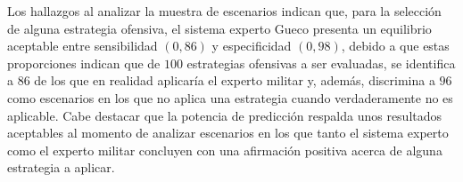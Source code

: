 Los hallazgos al analizar la muestra de escenarios indican que, para la selección de alguna estrategia ofensiva, el sistema experto Gueco presenta un equilibrio aceptable entre sensibilidad $(0,86)$ y especificidad $(0,98)$, debido a que estas proporciones indican que de $100$ estrategias ofensivas a ser evaluadas, se identifica a $86$ de los que en realidad aplicaría el experto militar y, además, discrimina a $96$ como escenarios en los que no aplica una estrategia cuando verdaderamente no es aplicable. Cabe destacar que la potencia de predicción respalda unos resultados aceptables al momento de analizar escenarios en los que tanto el sistema experto como el experto militar concluyen con una afirmación positiva acerca de alguna estrategia a aplicar.

